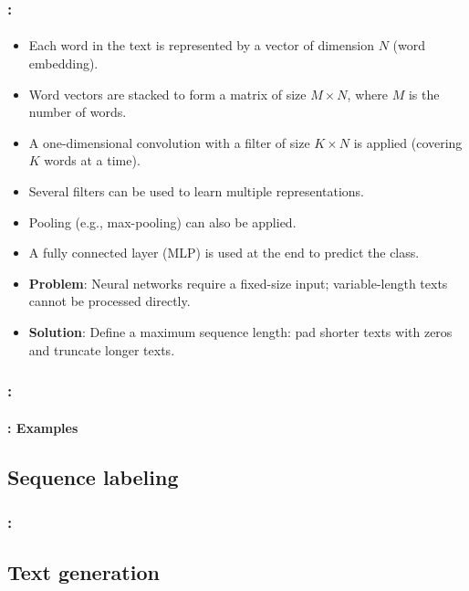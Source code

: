 \documentclass[xcolor=table]{beamer}
\begin{document}
\begin{frame}
	\frametitle{\insertshortsubtitle: \insertsection}
	\framesubtitle{\insertsubsection}
	
	\begin{itemize}
		\item Each word in the text is represented by a vector of dimension $N$ (word embedding).
		\item Word vectors are stacked to form a matrix of size $M \times N$, where $M$ is the number of words.
		\item A one-dimensional convolution with a filter of size $K \times N$ is applied (covering $K$ words at a time).
		\item Several filters can be used to learn multiple representations.
		\item Pooling (e.g., max-pooling) can also be applied.
		\item A fully connected layer (MLP) is used at the end to predict the class.
		\item \textbf{Problem}: Neural networks require a fixed-size input; variable-length texts cannot be processed directly.
		\item \textbf{Solution}: \textcolor{yellow!30}{Define a maximum sequence length: pad shorter texts with zeros and truncate longer texts.}
	\end{itemize}
	
\end{frame}

\begin{frame}
	\frametitle{\insertshortsubtitle: \insertsection}
	\framesubtitle{\insertsubsection: Examples}
	
	
\end{frame}

\subsection{Sequence labeling}

\begin{frame}
	\frametitle{\insertshortsubtitle: \insertsection}
	\framesubtitle{\insertsubsection}
	
	
\end{frame}


\subsection{Text generation}
\end{document}
